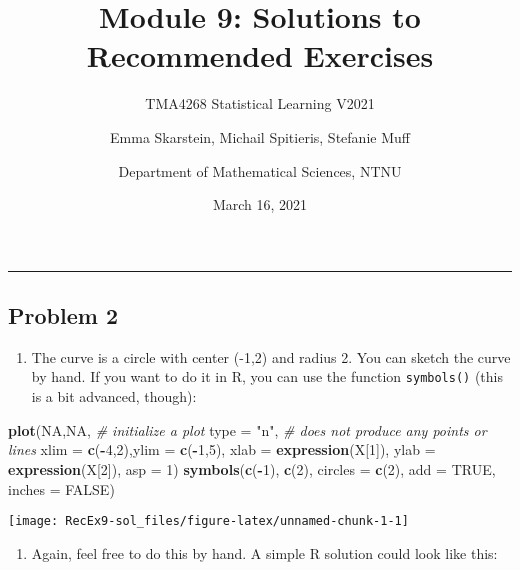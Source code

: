 \documentclass[]{article}
\title{Module 9: Solutions to Recommended Exercises}
\subtitle{TMA4268 Statistical Learning V2021}
\author{Emma Skarstein, Michail Spitieris, Stefanie Muff \and Department of Mathematical Sciences, NTNU}
\date{March 16, 2021}
\newenvironment{Shaded}{\begin{snugshade}}{\end{snugshade}}
\newcommand{\CommentTok}[1]{\textcolor[rgb]{0.56,0.35,0.01}{\textit{#1}}}
\newcommand{\DataTypeTok}[1]{\textcolor[rgb]{0.13,0.29,0.53}{#1}}
\newcommand{\DecValTok}[1]{\textcolor[rgb]{0.00,0.00,0.81}{#1}}
\newcommand{\KeywordTok}[1]{\textcolor[rgb]{0.13,0.29,0.53}{\textbf{#1}}}
\newcommand{\NormalTok}[1]{#1}
\newcommand{\OperatorTok}[1]{\textcolor[rgb]{0.81,0.36,0.00}{\textbf{#1}}}
\newcommand{\OtherTok}[1]{\textcolor[rgb]{0.56,0.35,0.01}{#1}}
\newcommand{\StringTok}[1]{\textcolor[rgb]{0.31,0.60,0.02}{#1}}
\providecommand{\tightlist}{%
  \setlength{\itemsep}{0pt}\setlength{\parskip}{0pt}}
\begin{document}
\maketitle

\begin{center}\rule{0.5\linewidth}{0.5pt}\end{center}

\hypertarget{problem-2}{%
\subsection{Problem 2}\label{problem-2}}

\begin{enumerate}
\def\labelenumi{\alph{enumi})}
\tightlist
\item
  The curve is a circle with center (-1,2) and radius 2. You can sketch
  the curve by hand. If you want to do it in R, you can use the function
  \texttt{symbols()} (this is a bit advanced, though):
\end{enumerate}

\begin{Shaded}
\begin{Highlighting}[]
\KeywordTok{plot}\NormalTok{(}\OtherTok{NA}\NormalTok{,}\OtherTok{NA}\NormalTok{, }\CommentTok{# initialize a plot}
     \DataTypeTok{type =} \StringTok{"n"}\NormalTok{, }\CommentTok{# does not produce any points or lines}
     \DataTypeTok{xlim =} \KeywordTok{c}\NormalTok{(}\OperatorTok{-}\DecValTok{4}\NormalTok{,}\DecValTok{2}\NormalTok{),}\DataTypeTok{ylim =} \KeywordTok{c}\NormalTok{(}\OperatorTok{-}\DecValTok{1}\NormalTok{,}\DecValTok{5}\NormalTok{), }\DataTypeTok{xlab =} \KeywordTok{expression}\NormalTok{(X[}\DecValTok{1}\NormalTok{]), }\DataTypeTok{ylab =} \KeywordTok{expression}\NormalTok{(X[}\DecValTok{2}\NormalTok{]),}
     \DataTypeTok{asp =} \DecValTok{1}\NormalTok{)}
\KeywordTok{symbols}\NormalTok{(}\KeywordTok{c}\NormalTok{(}\OperatorTok{-}\DecValTok{1}\NormalTok{), }\KeywordTok{c}\NormalTok{(}\DecValTok{2}\NormalTok{), }\DataTypeTok{circles =} \KeywordTok{c}\NormalTok{(}\DecValTok{2}\NormalTok{), }\DataTypeTok{add =} \OtherTok{TRUE}\NormalTok{,  }\DataTypeTok{inches =} \OtherTok{FALSE}\NormalTok{)}
\end{Highlighting}
\end{Shaded}

\texttt{[image: RecEx9-sol\_files/figure-latex/unnamed-chunk-1-1]}

\begin{enumerate}
\def\labelenumi{\alph{enumi})}
\setcounter{enumi}{1}
\tightlist
\item
  Again, feel free to do this by hand. A simple R solution could look
  like this:
\end{enumerate}
\end{document}
